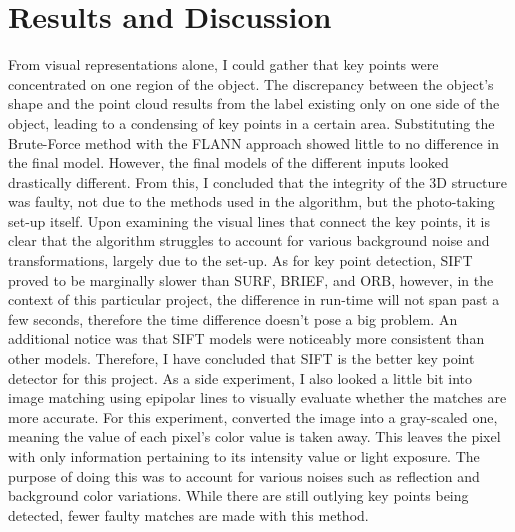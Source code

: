 \documentclass[10pt,twocolumn]{article}
\begin{document}
\section{Results and Discussion}
From visual representations alone, I could gather that key points were concentrated on one region of the object. The discrepancy between the object's shape and the point cloud results from the label existing only on one side of the object, leading to a condensing of key points in a certain area. 
Substituting the Brute-Force method with the FLANN approach showed little to no difference in the final model. However, the final models of the different inputs looked drastically different. From this, I concluded that the integrity of the 3D structure was faulty, not due to the methods used in the algorithm, but the photo-taking set-up itself. Upon examining the visual lines that connect the key points, it is clear that the algorithm struggles to account for various background noise and transformations, largely due to the set-up.
As for key point detection, SIFT proved to be marginally slower than SURF, BRIEF, and ORB, however, in the context of this particular project, the difference in run-time will not span past a few seconds, therefore the time difference doesn't pose a big problem. An additional notice was that SIFT models were noticeably more consistent than other models. Therefore, I have concluded that SIFT is the better key point detector for this project.
As a side experiment, I also looked a little bit into image matching using epipolar lines to visually evaluate whether the matches are more accurate. For this experiment, converted the image into a gray-scaled one, meaning the value of each pixel's color value is taken away. This leaves the pixel with only information pertaining to its intensity value or light exposure. The purpose of doing this was to account for various noises such as reflection and background color variations. While there are still outlying key points being detected, fewer faulty matches are made with this method.
\end{document}
